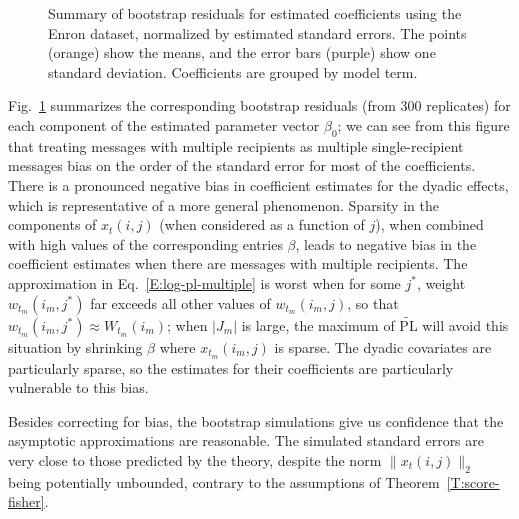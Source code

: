 \documentclass[final]{statsoc}
\begin{document}
\begin{figure}
    \centering
    \caption{
        Summary of bootstrap residuals
        for estimated coefficients using the Enron dataset, normalized by
        estimated standard errors.  The points (orange) show the means, and
        the error bars (purple) show one standard deviation.  Coefficients
        are grouped by model term.
    }
    \label{F:boot-resid}
\end{figure}

Fig.~\ref{F:boot-resid} summarizes the corresponding bootstrap residuals (from
$300$ replicates) for each component of the estimated parameter vector
$\beta_0$; we can see from this figure that treating messages with multiple
recipients as multiple single-recipient messages bias on the order of the
standard error for most of the coefficients.  There is a pronounced negative
bias in coefficient estimates for the dyadic effects, which is representative
of a more general phenomenon.  Sparsity in the components of $x_{t}(i,j)$
(when considered as a function of $j$), when combined with high values of the
corresponding entries $\beta$, leads to negative bias in the coefficient
estimates when there are messages with multiple recipients.  The approximation
in Eq.~\eqref{E:log-pl-multiple} is worst when for some $j^\ast$, weight
$w_{t_m}(i_m,j^\ast)$ far exceeds all other values of $w_{t_m}(i_m,j)$, so
that $w_{t_m}(i_m, j^\ast) \approx W_{t_m}(i_m)$; when $|J_m|$ is large, the
maximum of $\widetilde{\mathrm{PL}}$ will avoid this situation by shrinking
$\beta$ where $x_{t_m}(i_m, j)$ is sparse.  The dyadic covariates are
particularly sparse, so the estimates for their coefficients are particularly
vulnerable to this bias.

Besides correcting for bias, the bootstrap simulations give us confidence that
the asymptotic approximations are reasonable.  The simulated standard errors
are very close to those predicted by the theory, despite the norm $\| x_t(i,j)
\|_2$ being potentially unbounded, contrary to the assumptions of
Theorem~\ref{T:score-fisher}.
\end{document}
